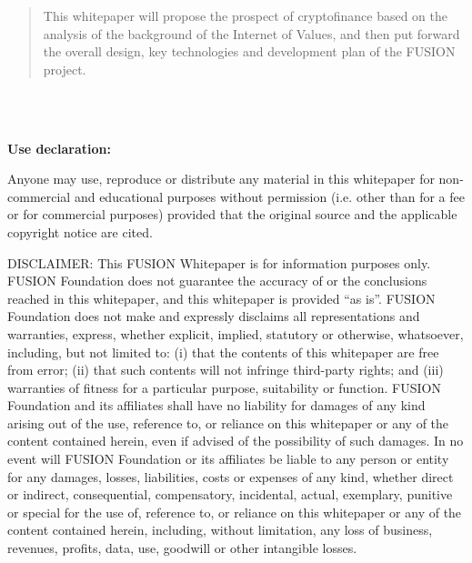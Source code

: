 \documentclass[a4paper,12pt]{article}
\begin{document}
\begin{abstract}
This whitepaper will propose the prospect of cryptofinance based on the analysis of the background of the Internet of Values, and then put forward the overall design, key technologies and development plan of the FUSION project.

\end{abstract}
\thispagestyle{empty}

\medskip
\noindent
 \\\\
\medskip
\noindent


\newpage

\noindent
\textbf{\large{Use declaration:}}
 \onehalfspacing
\thispagestyle{empty}

\onehalfspacing

Anyone may use, reproduce or distribute any material in this whitepaper for non-commercial and educational purposes without permission (i.e. other than for a fee or for commercial purposes) provided that the original source and the applicable copyright notice are cited.
 
DISCLAIMER: This FUSION Whitepaper is for information purposes only. FUSION Foundation does not guarantee the accuracy of or the conclusions reached in this whitepaper, and this whitepaper is provided “as is”. FUSION Foundation does not make and expressly disclaims all representations and warranties, express, whether explicit, implied, statutory or otherwise, whatsoever, including, but not limited to: (i) that the contents of this whitepaper are free from error; (ii) that such contents will not infringe third-party rights; and (iii) warranties of fitness for a particular purpose, suitability or function. FUSION Foundation and its affiliates shall have no liability for damages of any kind arising out of the use, reference to, or reliance on this whitepaper or any of the content contained herein, even if advised of the possibility of such damages. In no event will FUSION Foundation or its affiliates be liable to any person or entity for any damages, losses, liabilities, costs or expenses of any kind, whether direct or indirect, consequential, compensatory, incidental, actual, exemplary, punitive or special for the use of, reference to, or reliance on this whitepaper or any of the content contained herein, including, without limitation, any loss of business, revenues, profits, data, use, goodwill or other intangible losses.
\newpage
\thispagestyle{empty}
\renewcommand{\contentsname}{\centerline{Contents}}
\tableofcontents
\thispagestyle{empty}
\newpage
\clearpage
\onehalfspacing
\setcounter{footnote}{0}
\renewcommand{\thefootnote}{\arabic{footnote}}
\setcounter{page}{1}
\pagestyle{fancy}
\end{document}
